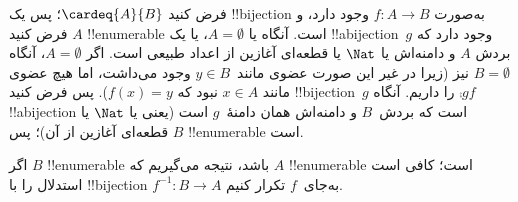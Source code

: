  {
  فرض کنید $\cardeq{A}{B}$؛ پس یک !!{bijection} به‌صورت $f \colon A
  \to B$ وجود دارد، و فرض کنید $A$ !!{enumerable} است.
  {
    آنگاه یا $A  = \emptyset$، یا یک !!a{bijection}~$g$ وجود دارد که
    بردش $A$ و دامنه‌اش یا $\Nat$ یا قطعه‌ای آغازین از اعداد طبیعی
    است. اگر $A = \emptyset$، آنگاه $B =
    \emptyset$ نیز (زیرا در غیر این صورت عضوی مانند~$y \in B$ وجود می‌داشت، اما
    هیچ عضوی مانند $x
    \in A$ نبود که $f(x) = y$). پس فرض کنید !!{bijection}~$g$ را
    داریم. آنگاه $\comp{g}{f}$ !!a{bijection} است که بردش~$B$ و دامنه‌اش
    همان دامنهٔ~$g$ است (یعنی یا $\Nat$ یا قطعه‌ای آغازین از آن)؛ پس
    $B$ !!{enumerable} است.}

  اگر $B$ !!{enumerable} باشد، نتیجه می‌گیریم که $A$ !!{enumerable} است؛
  کافی است استدلال را با !!{bijection} $f^{-1}\colon B \to A$ به‌جای~$f$
  تکرار کنیم.
 }

